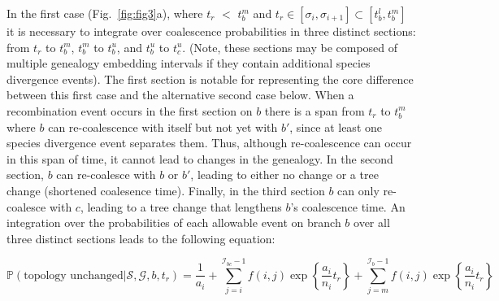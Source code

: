 \documentclass[11pt]{article}
\begin{document}
In the first case (Fig.~\ref{fig:fig3}a), where $t_r$ $<$ $t_b^m$ and 
$t_r \in [\sigma_i, \sigma_{i+1}] \subset [t_b^l,t_b^m]$
it is necessary to integrate over coalescence probabilities in three distinct sections:
from $t_r$ to $t_b^m$, $t_b^m$ to $t_b^u$, and $t_b^u$ to $t_c^u$. 
(Note, these sections may be composed of multiple genealogy embedding 
intervals if they contain additional species divergence events).
The first section is notable for representing the core
difference between this first case and the alternative second case below. 
When a recombination event occurs in the first section on $b$ there is a span 
from $t_r$ to $t_b^m$ where $b$ can re-coalescence with itself but not yet 
with $b'$, since at least one species divergence event separates them.
Thus, although re-coalescence can occur in this span of time, it cannot lead to 
changes in the genealogy. 
In the second section, 
$b$ can re-coalesce with $b$ or $b'$, leading to either no change or a tree 
change (shortened coalesence time). Finally, in the third section $b$ can 
only re-coalesce with $c$, leading to a tree change that lengthens $b$'s 
coalescence time. An integration over the probabilities of each allowable 
event on branch $b$ over all three distinct sections leads to the
following equation:


\begin{equation}
	\mathbb{P}(\textrm{topology unchanged} | \mathcal{S},\mathcal{G},b,t_r) = 
	\frac{1}{a_i} + \sum_{j=i}^{\mathcal{I}_{bc}-1} 
	f(i,j) \exp\left\{\frac{a_i}{n_i}t_r\right\} + 
	\sum_{j=m}^{\mathcal{I}_b-1}f(i,j)\exp\left\{\frac{a_i}{n_i}t_r\right\}
\end{equation}
\end{document}
